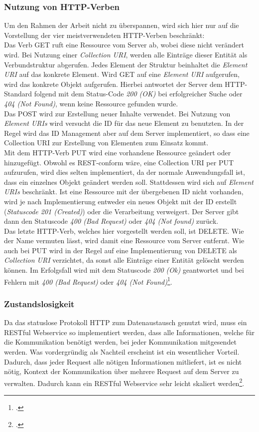 \subsubsection*{Nutzung von HTTP-Verben}
Um den Rahmen der Arbeit nicht zu überspannen, wird sich hier nur auf die Vorstellung der vier meistverwendeten HTTP-Verben beschränkt:\\
Das Verb GET ruft eine Ressource vom Server ab, wobei diese nicht verändert wird. Bei Nutzung einer \textit{Collection URI}, werden alle Einträge dieser Entität als Verbundstruktur abgerufen. Jedes Element der Struktur beinhaltet die \textit{Element URI} auf das konkrete Element. Wird GET auf eine \textit{Element URI} aufgerufen, wird das konkrete Objekt aufgerufen. Hierbei antwortet der Server dem HTTP-Standard folgend mit dem Status-Code \textit{200 (OK)} bei erfolgreicher Suche oder \textit{404 (Not Found)}, wenn keine Ressource gefunden wurde.\\
Das POST wird zur Erstellung neuer Inhalte verwendet. Bei Nutzung von \textit{Element URIs} wird versucht die ID für das neue Element zu benutzten. In der Regel wird das ID Management aber auf dem Server implementiert, so dass eine Collection URI zur Erstellung von Elementen zum Einsatz kommt.\\
Mit dem HTTP-Verb PUT wird eine vorhandene Ressource geändert oder hinzugefügt. Obwohl es REST-conform wäre, eine Collection URI per PUT aufzurufen, wird dies selten implementiert, da der normale Anwendungsfall ist, dass ein einzelnes Objekt geändert werden soll. Stattdessen wird sich auf \textit{Element URIs} beschränkt. Ist eine Ressource mit der übergebenen ID nicht vorhanden, wird je nach Implementierung entweder ein neues Objekt mit der ID erstellt (\textit{Statuscode 201 (Created)}) oder die Verarbeitung verweigert. Der Server gibt dann den Statuscode \textit{400 (Bad Request)} oder \textit{404 (Not found)}  zurück. \\
Das letzte HTTP-Verb, welches hier vorgestellt werden soll, ist DELETE. Wie der Name vermuten lässt, wird damit eine Ressource vom Server entfernt. Wie auch bei PUT wird in der Regel auf eine Implementierung von DELETE als \textit{Collection URI} verzichtet, da sonst alle Einträge einer Entität gelöscht werden können. Im Erfolgsfall wird mit dem Statuscode \textit{200 (Ok)} geantwortet und bei Fehlern mit \textit{400 (Bad Request)} oder \textit{404 (Not Found)}\footcite[S. 26ff.]{REST-und-HTTP}.
\subsubsection*{Zustandslosigkeit}
Da das statuslose Protokoll HTTP zum Datenaustausch genutzt wird, muss ein RESTful Webservice so implementiert werden, dass alle Informationen, welche für die Kommunikation benötigt werden, bei jeder Kommunikation mitgesendet werden. Was vordergründig als Nachteil erscheint ist ein wesentlicher Vorteil. Dadurch, dass jeder Request alle nötigen Informationen mitliefert, ist es nicht nötig, Kontext der Kommunikation über mehrere Request auf dem Server zu verwalten. Dadurch kann ein RESTful Webservice sehr leicht skaliert werden\footcite[S. 26ff.]{REST-und-HTTP}.
